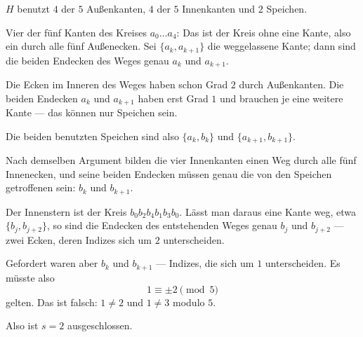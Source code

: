 \begin{merksatz}
$H$ benutzt $4$ der $5$ Außenkanten, $4$ der $5$ Innenkanten und $2$ Speichen.

Vier der fünf Kanten des Kreises $a_0 \ldots a_4$: Das ist der Kreis ohne eine Kante, also ein  durch alle fünf Außenecken. Sei $\{a_k, a_{k+1}\}$ die weggelassene Kante; dann sind die beiden Endecken des Weges genau $a_k$ und $a_{k+1}$.

Die Ecken im Inneren des Weges haben schon Grad $2$ durch Außenkanten. Die beiden Endecken $a_k$ und $a_{k+1}$ haben erst Grad $1$ und brauchen je eine weitere Kante --- das können nur Speichen sein.

Die beiden benutzten Speichen sind also $\{a_k, b_k\}$ und $\{a_{k+1}, b_{k+1}\}$.

Nach demselben Argument bilden die vier Innenkanten einen Weg durch alle fünf Innenecken, und seine beiden Endecken müssen genau die von den Speichen getroffenen sein: $b_k$ und $b_{k+1}$.

Der Innenstern ist der Kreis $b_0 b_2 b_4 b_1 b_3 b_0$. Lässt man daraus eine Kante weg, etwa $\{b_j, b_{j+2}\}$, so sind die Endecken des entstehenden Weges genau $b_j$ und $b_{j+2}$ --- zwei Ecken, deren Indizes sich um $2$ unterscheiden.

Gefordert waren aber $b_k$ und $b_{k+1}$ --- Indizes, die sich um $1$ unterscheiden. Es müsste also
\[ 1 \equiv \pm 2 \pmod 5 \]
gelten. Das ist falsch: $1 \neq 2$ und $1 \neq 3$ modulo $5$.

Also ist $s = 2$ ausgeschlossen.
\end{merksatz}

